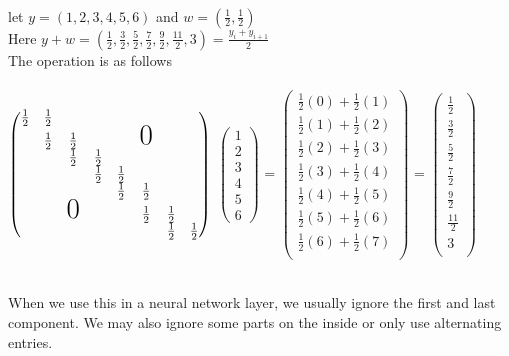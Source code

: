 \begin{example} \quad
\\
let $y=(1,2,3,4,5,6)$ and $w=(\frac{1}{2},\frac{1}{2})$
\\
Here $y+w = (\frac{1}{2},\frac{3}{2},\frac{5}{2},\frac{7}{2},\frac{9}{2},\frac{11}{2},3)=\frac{y_i+y_{i+1}}{2}$
\\
The operation is as follows
\\\\
$\begin{pmatrix}
\frac{1}{2}&\frac{1}{2} & & & & & &\\
& \frac{1}{2}&\frac{1}{2} & & & \text{\huge0}& &\\
&& \frac{1}{2}&\frac{1}{2} & & & &\\
&&& \frac{1}{2}& \frac{1}{2} & & &\\
&&&&\frac{1}{2} &\frac{1}{2} & &\\
&&\text{\huge0}&&&\frac{1}{2} &\frac{1}{2} &\\
&&&&&&\frac{1}{2} &\frac{1}{2}
\end{pmatrix}$
$\begin{pmatrix}
1\\2\\3\\4\\5\\6
\end{pmatrix}$
=
$\begin{pmatrix}

\frac{1}{2}(0) + \frac{1}{2}(1)\\
\frac{1}{2}(1) + \frac{1}{2}(2)\\
\frac{1}{2}(2) + \frac{1}{2}(3)\\
\frac{1}{2}(3) + \frac{1}{2}(4)\\
\frac{1}{2}(4) + \frac{1}{2}(5)\\
\frac{1}{2}(5) + \frac{1}{2}(6)\\
\frac{1}{2}(6) + \frac{1}{2}(7)\\
\end{pmatrix}
$
=
$
\begin{pmatrix}
\frac{1}{2}\\
\frac{3}{2}\\
\frac{5}{2}\\
\frac{7}{2}\\
\frac{9}{2}\\
\frac{11}{2}\\
3\\
\end{pmatrix}
$
\end{example}
\quad
\\
\noindent
When we use this in a neural network layer, we usually ignore the first and last component. We may also ignore some parts on the inside or only use alternating entries.

